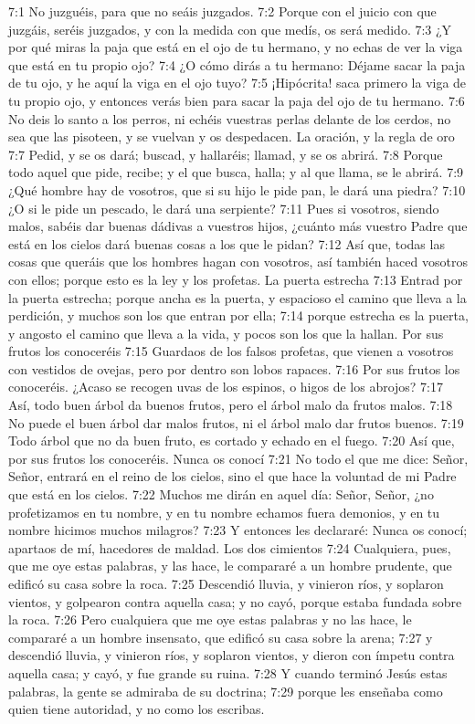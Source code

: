7:1 No juzguéis, para que no seáis juzgados. 
7:2 Porque con el juicio con que juzgáis, seréis juzgados, y con la medida con que medís, os será medido. 
7:3 ¿Y por qué miras la paja que está en el ojo de tu hermano, y no echas de ver la viga que está en tu propio ojo? 
7:4 ¿O cómo dirás a tu hermano: Déjame sacar la paja de tu ojo, y he aquí la viga en el ojo tuyo? 
7:5 ¡Hipócrita! saca primero la viga de tu propio ojo, y entonces verás bien para sacar la paja del ojo de tu hermano. 
7:6 No deis lo santo a los perros, ni echéis vuestras perlas delante de los cerdos, no sea que las pisoteen, y se vuelvan y os despedacen. 
La oración, y la regla de oro  
7:7 Pedid, y se os dará; buscad, y hallaréis; llamad, y se os abrirá. 
7:8 Porque todo aquel que pide, recibe; y el que busca, halla; y al que llama, se le abrirá. 
7:9 ¿Qué hombre hay de vosotros, que si su hijo le pide pan, le dará una piedra? 
7:10 ¿O si le pide un pescado, le dará una serpiente? 
7:11 Pues si vosotros, siendo malos, sabéis dar buenas dádivas a vuestros hijos, ¿cuánto más vuestro Padre que está en los cielos dará buenas cosas a los que le pidan? 
7:12 Así que, todas las cosas que queráis que los hombres hagan con vosotros, así también haced vosotros con ellos; porque esto es la ley y los profetas. 
La puerta estrecha  
7:13 Entrad por la puerta estrecha; porque ancha es la puerta, y espacioso el camino que lleva a la perdición, y muchos son los que entran por ella; 
7:14 porque estrecha es la puerta, y angosto el camino que lleva a la vida, y pocos son los que la hallan. 
Por sus frutos los conoceréis  
7:15 Guardaos de los falsos profetas, que vienen a vosotros con vestidos de ovejas, pero por dentro son lobos rapaces. 
7:16 Por sus frutos los conoceréis. ¿Acaso se recogen uvas de los espinos, o higos de los abrojos? 
7:17 Así, todo buen árbol da buenos frutos, pero el árbol malo da frutos malos. 
7:18 No puede el buen árbol dar malos frutos, ni el árbol malo dar frutos buenos. 
7:19 Todo árbol que no da buen fruto, es cortado y echado en el fuego. 
7:20 Así que, por sus frutos los conoceréis. 
Nunca os conocí  
7:21 No todo el que me dice: Señor, Señor, entrará en el reino de los cielos, sino el que hace la voluntad de mi Padre que está en los cielos. 
7:22 Muchos me dirán en aquel día: Señor, Señor, ¿no profetizamos en tu nombre, y en tu nombre echamos fuera demonios, y en tu nombre hicimos muchos milagros? 
7:23 Y entonces les declararé: Nunca os conocí; apartaos de mí, hacedores de maldad. 
Los dos cimientos  
7:24 Cualquiera, pues, que me oye estas palabras, y las hace, le compararé a un hombre prudente, que edificó su casa sobre la roca. 
7:25 Descendió lluvia, y vinieron ríos, y soplaron vientos, y golpearon contra aquella casa; y no cayó, porque estaba fundada sobre la roca. 
7:26 Pero cualquiera que me oye estas palabras y no las hace, le compararé a un hombre insensato, que edificó su casa sobre la arena; 
7:27 y descendió lluvia, y vinieron ríos, y soplaron vientos, y dieron con ímpetu contra aquella casa; y cayó, y fue grande su ruina. 
7:28 Y cuando terminó Jesús estas palabras, la gente se admiraba de su doctrina; 
7:29 porque les enseñaba como quien tiene autoridad, y no como los escribas. 
